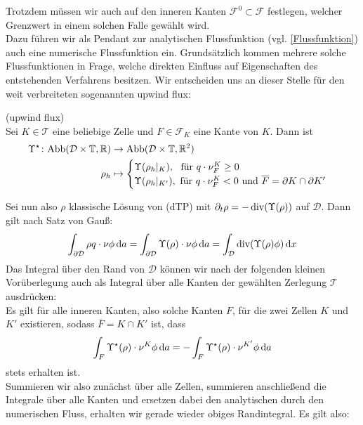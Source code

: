 Trotzdem müssen wir auch auf den inneren Kanten $ \mathcal{F}^0 \subset \mathcal{F} $ festlegen, welcher Grenzwert in einem solchen Falle gewählt wird. \\
Dazu führen wir als Pendant zur analytischen Flussfunktion (vgl. \ref{Flussfunktion})
auch eine numerische Flussfunktion ein. Grundsätzlich kommen mehrere solche Flussfunktionen in Frage, welche direkten Einfluss auf Eigenschaften des entstehenden Verfahrens besitzen. Wir entscheiden uns an dieser Stelle für den weit verbreiteten 
sogenannten upwind flux:
\begin{Definition}(upwind flux)\\
	Sei $K \in \mathcal{T}$ eine beliebige Zelle und $ F \in \mathcal{F}_K$ eine Kante von $K$. Dann ist
	\begin{align*}
		\Upsilon^{\star} \colon \text{Abb}(\mathcal{D}\times\mathbb{T},\mathbb{R}) &\to \text{Abb}(\mathcal{D}\times\mathbb{T},\mathbb{R}^2) \\
		\rho_h &\mapsto 
		\begin{cases}
			\Upsilon(\rho_h|_K) , \ \text{ für } q\cdot \nu_F^K \geq 0 \\  
			\Upsilon(\rho_h|_{K'}) ,\text{ für } q\cdot \nu_F^K < 0 \text{ und } \overline{F} = \partial K \cap \partial K'
		\end{cases}
	\end{align*}
\end{Definition}
Sei nun also $ \rho $ klassische Lösung von (dTP) mit $ \partial_t \rho = -\operatorname{div}(\Upsilon(\rho)) $ auf $ \mathcal{D} $. Dann gilt nach Satz von Gauß:
\begin{align}
		\label{gaus1}
		\int_{\partial \mathcal{D}} \rho q \cdot  \nu \phi \, \mathrm{d} a  =\int_{\partial \mathcal{D}} \Upsilon(\rho) \cdot \nu \phi \, \mathrm{d} a = \int_{\mathcal{D}} \operatorname{div} (\Upsilon(\rho)\phi) \, \mathrm{d} x
\end{align}
Das Integral über den Rand von $ \mathcal{D} $ können wir nach der folgenden kleinen Vorüberlegung auch als Integral über alle Kanten der gewählten Zerlegung $ \mathcal{T} $ ausdrücken: \\
Es gilt für alle inneren Kanten, also solche Kanten $ F $, für die zwei Zellen $ K $ und $ K' $ existieren, sodass $ \overline{F} = K \cap K' $ ist, dass \[ \int_F \Upsilon^{\star}(\rho) \cdot \nu^K \phi \, \mathrm{d} a = - \int_F \Upsilon^{\star}(\rho) \cdot \nu^{K'} \phi \, \mathrm{d} a \] stets erhalten ist. \\
Summieren wir also zunächst über alle Zellen, summieren anschließend die Integrale über alle Kanten und ersetzen dabei den analytischen durch den numerischen Fluss, erhalten wir gerade wieder obiges Randintegral. Es gilt also:
